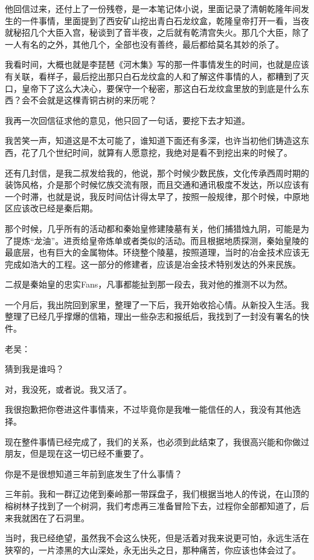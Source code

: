 他回信过来，还付上了一份残卷，是一本笔记体小说，里面记录了清朝乾隆年间发生的一件事情，里面提到了西安矿山挖出青白石龙纹盒，乾隆皇帝打开一看，当夜就秘招几个大臣入宫，秘谈到了音半夜，之后就有乾清宫失火。那几个大臣，除了一人有名的之外，其他几个，全部也没有善终，最后都给莫名其妙的杀了。

我看时间，大概也就是李琵琶《河木集》写的那一件事情发生的时间，也就是应该有关联，看样子，最后挖出那只白石龙纹盒的人和了解这件事情的人，都糟到了灭口，皇帝下了这么大决心，要保守一个秘密，那这白石龙纹盒里放的到底是什么东西？会不会就是这棵青铜古树的来历呢？

我再一次回信征求他的意见，他只回了一句话，要挖下去才知道。

我苦笑一声，知道这是不太可能了，谁知道下面还有多深，也许当初他们铸造这东西，花了几个世纪时间，就算有人愿意挖，我绝对是看不到挖出来的时候了。

还有几封信，是我二叔发给我的，他说，那个时候少数民族，文化传承西周时期的装饰风格，介是那个时候忆族交流有限，而且交通和通讯极度不发达，所以应该有一个时滞，也就是说，我反时间估计得太早了，按照一般规律，那个时候，中原地区应该改已经是秦后期。

那个时候，几乎所有的活动都和秦始皇修建陵墓有关，他们捕猎烛九阴，可能是为了提炼“龙油”。进贡给皇帝炼单或者类似的活动。而且根据地质探测，秦始皇陵的最底层，也有巨大的金属物体。环绕整个陵墓，按照道理，当时的冶金技术应该无完成如浩大的工程。这一部分的修建者，应该是冶金技术特别发达的外来民族。

二叔是秦始皇的忠实Fans，凡事都能扯到那一段去，我对他的推测不以为然。

一个月后，我出院回到家里，整理了一下后，我开始收拾心情。从新投入生活。我整理了已经几乎撑爆的信箱，理出一些杂志和报纸后，我找到了一封没有署名的快件。

老吴：

猜到我是谁吗？

对，我没死，或者说。我又活了。

我很抱歉把你卷进这件事情来，不过毕竟你是我唯一能信任的人，我没有其他选择。

现在整件事情已经完成了，我们的关系，也必须到此结束了，我很高兴能和你做过朋友，但是现在这一切已经不重要了。

你是不是很想知道三年前到底发生了什么事情？

三年前。我和一群辽边佬到秦岭那一带踩盘子，我们根据当地人的传说，在山顶的榕树林子找到了一个树洞，我们考虑再三准备冒险下去，过程你全部都知道了，后来我就困在了石洞里。

当时，我已经绝望，虽然我不会这么快死，但是活着对我来说更可怕，永远生活在狭窄的，一片漆黑的大山深处，永无出头之日，那种痛苦，你应该也体会过了。

